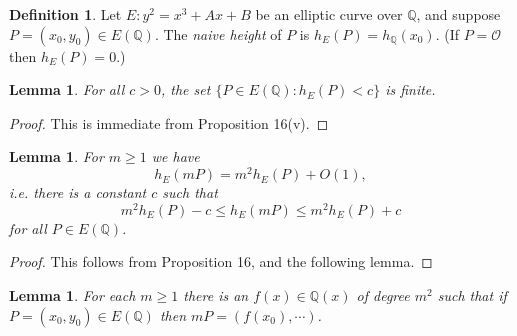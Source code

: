 \documentclass[a4paper]{article}
\theoremstyle{plain}
\newtheorem{lemma}[theorem]{Lemma}
\theoremstyle{remark}
\theoremstyle{definition}
\newtheorem*{definition}{Definition}
\renewcommand{\O}{\mathcal{O}}
\newcommand{\Q}{\mathbb{Q}}
\begin{document}
\begin{definition}
    Let $E:y^2=x^3+Ax+B$ be an elliptic curve over $\Q$, and suppose
    $P=(x_0,y_0)\in E(\Q)$. The \emph{naive height} of $P$ is
    $h_E(P)=h_\Q(x_0)$. (If $P=\O$ then $h_E(P)=0$.)
\end{definition}

\begin{lemma}
    For all $c>0$, the set $\{P\in E(\Q):h_E(P)<c\}$ is finite.
\end{lemma}

\begin{proof}
    This is immediate from Proposition 16(v).
\end{proof}

\begin{lemma}
    For $m\ge1$ we have
    \begin{equation*}
        h_E(mP) = m^2h_E(P) + O(1),
    \end{equation*}
    i.e. there is a constant $c$ such that
    \begin{equation*}
        m^2h_E(P) - c \le h_E(mP) \le m^2h_E(P) + c
    \end{equation*}
    for all $P\in E(\Q)$.
\end{lemma}

\begin{proof}
    This follows from Proposition 16, and the following lemma.
\end{proof}

\begin{lemma}
    For each $m\ge1$ there is an $f(x)\in\Q(x)$ of degree $m^2$ such that if
    $P=(x_0,y_0)\in E(\Q)$ then $mP=(f(x_0),\cdots)$.
\end{lemma}
\end{document}
